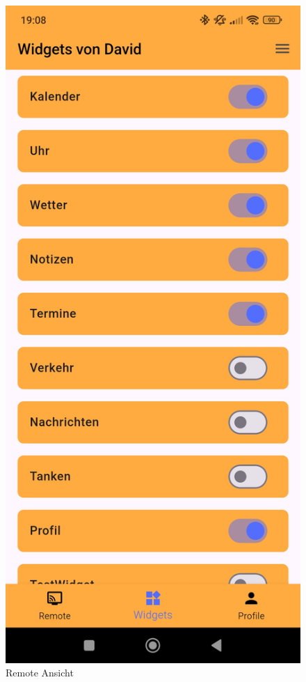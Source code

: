 \begin{figure}[h]
\begin{minipage}[b]{0.27\textwidth}
        \captionsetup{justification=centering, labelformat=simple, singlelinecheck=false}
        \caption{Remote Ansicht}
    \end{minipage}
    \hfill
    \begin{minipage}[b]{0.27\textwidth}
        \centering
        \includegraphics[width=\textwidth]{pictures/remote_widgets.jpg}

\end{minipage}
\end{figure}
